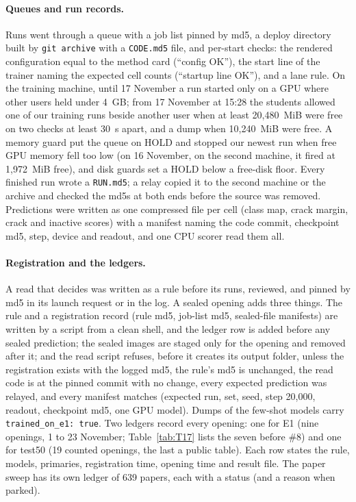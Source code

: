 \paragraph{Queues and run records.} Runs went through a queue with a job list pinned by md5, a deploy directory built by
\texttt{git archive} with a \texttt{CODE.md5} file, and per-start checks: the rendered configuration equal to the method card
(``config OK''), the start line of the trainer naming the expected cell counts (``startup line OK''), and a lane rule. On the
training machine, until 17 November a run started only on a GPU where other users held under 4~GB; from 17 November at 15:28 the
students allowed one of our training runs beside another user when at least 20,480~MiB were free on two checks at least 30~s apart,
and a dump when 10,240~MiB were free. A memory guard put the queue on HOLD and stopped our newest run when free GPU memory fell too
low (on 16 November, on the second machine, it fired at 1,972~MiB free), and disk guards set a HOLD below a free-disk floor.
Every finished run wrote a \texttt{RUN.md5}; a relay copied it to the second machine or the archive and checked the md5s at both
ends before the source was removed. Predictions were written as one compressed file per cell (class map, crack margin, crack and
inactive scores) with a manifest naming the code commit, checkpoint md5, step, device and readout, and one CPU scorer read them all.

\paragraph{Registration and the ledgers.} A read that decides was written as a rule before its runs, reviewed, and pinned by md5 in
its launch request or in the log. A sealed opening adds three things. The rule and a registration record (rule md5, job-list md5,
sealed-file manifests) are written by a script from a clean shell, and the ledger row is added before any sealed prediction; the
sealed images are staged only for the opening and removed after it; and the read script refuses, before it creates its output
folder, unless the registration exists with the logged md5, the rule's md5 is unchanged, the read code is at the pinned commit with
no change, every expected prediction was relayed, and every manifest matches (expected run, set, seed, step 20,000, readout,
checkpoint md5, one GPU model). Dumps of the few-shot models carry \texttt{trained\_on\_e1: true}. Two ledgers record every opening:
one for E1 (nine openings, 1 to 23 November; Table~\ref{tab:T17} lists the seven before \#8) and one for test50 (19 counted
openings, the last a public table). Each row states the rule, models, primaries, registration time, opening time and result
file. The paper sweep has its own ledger of 639 papers, each with a status (and a reason when parked).


